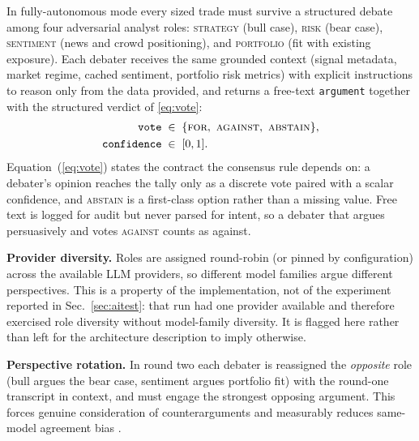 \documentclass[10pt,twocolumn]{IEEEtran}
\begin{document}
In fully-autonomous mode every sized trade must survive a structured debate
among four adversarial analyst roles: \textsc{strategy} (bull case),
\textsc{risk} (bear case), \textsc{sentiment} (news and crowd positioning),
and \textsc{portfolio} (fit with existing exposure). Each debater receives
the same grounded context (signal metadata, market regime, cached sentiment,
portfolio risk metrics) with explicit instructions to reason only from the
data provided, and returns a free-text \texttt{argument} together with the
structured verdict of \eqref{eq:vote}:
\begin{equation}
\label{eq:vote}
\begin{aligned}
\texttt{vote} \;&\in\; \{\textsc{for},\ \textsc{against},\ \textsc{abstain}\},\\
\texttt{confidence} \;&\in\; [0,1].
\end{aligned}
\end{equation}
Equation~(\ref{eq:vote}) states the contract the consensus rule depends on: a
debater's opinion reaches the tally only as a discrete vote paired with a
scalar confidence, and \textsc{abstain} is a first-class option rather than a
missing value. Free text is logged for audit but never parsed for intent, so a
debater that argues persuasively and votes \textsc{against} counts as against.

\textbf{Provider diversity.} Roles are assigned round-robin (or pinned by
configuration) across the available LLM providers, so different model
families argue different perspectives. This is a property of the
implementation, not of the experiment reported in Sec.~\ref{sec:aitest}: that
run had one provider available and therefore exercised role diversity without
model-family diversity. It is flagged here rather than left for the
architecture description to imply otherwise.

\textbf{Perspective rotation.} In round two each debater is reassigned the
\emph{opposite} role (bull argues the bear case, sentiment argues portfolio
fit) with the round-one transcript in context, and must engage the strongest
opposing argument. This forces genuine consideration of counterarguments
and measurably reduces same-model agreement bias \cite{du2023improving}.
\end{document}
